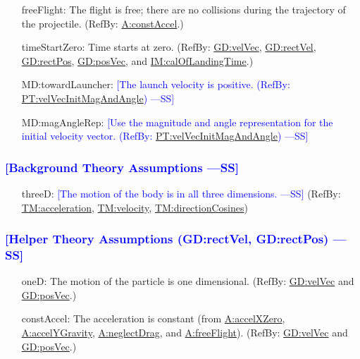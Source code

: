 \documentclass[12pt]{article}
\newcommand{\authornote}[3]{\textcolor{#1}{[#3 ---#2]}}
\newcommand{\authornote}[3]{}
\newcommand{\wss}[1]{\authornote{blue}{SS}{#1}}
\begin{document}
\begin{itemize}
\item[freeFlight:\phantomsection\label{freeFlight}]{The flight is free; there are no collisions during the trajectory of the projectile. (RefBy: \hyperref[constAccel]{A:constAccel}.)}
\item[timeStartZero:\phantomsection\label{timeStartZero}]{Time starts at zero. (RefBy: \hyperref[GD:velVec]{GD:velVec}, \hyperref[GD:rectVel]{GD:rectVel}, \hyperref[GD:rectPos]{GD:rectPos}, \hyperref[GD:posVec]{GD:posVec}, and \hyperref[IM:calOfLandingTime]{IM:calOfLandingTime}.)}
\item[MD:towardLauncher:\phantomsection\label{MD:towardLauncher}]\wss{The launch velocity is positive. (RefBy: \hyperref[PT:velVecInitMagAndAngle]{PT:velVecInitMagAndAngle})}
\item[MD:magAngleRep:\phantomsection\label{MD:magAngleRep}]\wss{Use the magnitude and angle representation for the initial velocity vector. (RefBy: \hyperref[PT:velVecInitMagAndAngle]{PT:velVecInitMagAndAngle})}

\end{itemize}

\subsubsection{\wss{Background Theory Assumptions}}

\begin{itemize}
\item[threeD:\phantomsection\label{threeD}]{\wss{The motion of the body is in
all three dimensions.} (RefBy: \hyperref[TM:acceleration] {TM:acceleration},
\hyperref[TM:velocity] {TM:velocity}, \hyperref[TM:directionCosines]
{TM:directionCosines})}
\end{itemize}

\subsubsection{\wss{Helper Theory Assumptions (GD:rectVel, GD:rectPos)}}

\begin{itemize}
\item[oneD:\phantomsection\label{oneD}]{The motion of the particle is one dimensional. (RefBy: \hyperref[GD:velVec]{GD:velVec} and \hyperref[GD:posVec]{GD:posVec}.)}
\item[constAccel:\phantomsection\label{constAccel}]{The acceleration is constant (from \hyperref[accelXZero]{A:accelXZero}, \hyperref[accelYGravity]{A:accelYGravity}, \hyperref[neglectDrag]{A:neglectDrag}, and \hyperref[freeFlight]{A:freeFlight}). (RefBy: \hyperref[GD:velVec]{GD:velVec} and \hyperref[GD:posVec]{GD:posVec}.)}
\end{itemize}
\end{document}
